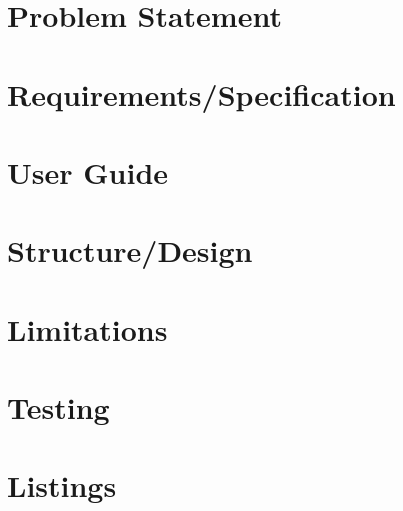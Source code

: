 \documentclass{report}
\begin{document}
\section{Problem Statement}
\section{Requirements/Specification}
\section{User Guide}
\section{Structure/Design}
\section{Limitations}
\section{Testing}
\section{Listings}
\end{document}
